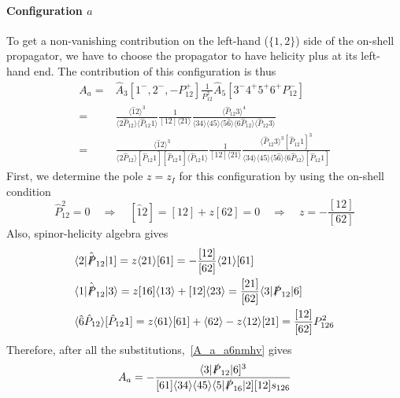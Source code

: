\paragraph{Configuration $a$}
To get a non-vanishing contribution on the left-hand ($\{1,2\}$) side of the on-shell propagator, we have to choose the propagator to have helicity plus at its left-hand end.
The contribution of this configuration is thus  
\begin{equation}\label{A_a_a6nmhv}
\begin{split}
A_a = & \hat{A}_3[1^-,2^-, -P_{12}^+]\frac{1}{P_{12}^2}\hat{A}_5[3^-4^+5^+6^+ P_{12}^-]
\\
= &\frac{\langle \hat{1}2\rangle^3}{\langle 2\hat{P}_{12}\rangle\langle \hat{P}_{12} 1\rangle}
\frac{1}{[12]\langle 21\rangle}
\frac{\langle \hat{P}_{12} 3\rangle^4}{\langle 34\rangle\langle 45\rangle\langle 5\hat{6}\rangle\langle 6\hat{P}_{12}\rangle\langle \hat{P}_{12} 3\rangle}
\\
=&
\frac{\langle \hat{1}2\rangle^3}{\langle 2\hat{P}_{12}\rangle[\hat{P}_{12} 1][\hat{P}_{12} 1]\langle \hat{P}_{12} 1\rangle}
\frac{1}{[12]\langle 21\rangle}
\frac{\langle \hat{P}_{12} 3\rangle^3[\hat{P}_{12} 1]^3}{\langle 34\rangle\langle 45\rangle\langle 5\hat{6}\rangle\langle 6\hat{P}_{12}\rangle[\hat{P}_{12} 1]}
\end{split}
\end{equation}
First, we determine the pole $z=z_I$ for this configuration by using the on-shell condition 
\begin{equation}
\hat{P}_{12}^2 = 0
\quad\Rightarrow\quad
[\hat{1}2] =  [12] + z[62] = 0
\quad\Rightarrow\quad
z= -\frac{[12]}{[62]}
\end{equation}
Also, spinor-helicity algebra gives
\begin{equation}
\begin{split}
& \langle 2 |\hat{\slashed{P}}_{12}|1] = z\langle 21\rangle[61] = -\frac{[12]}{[62]}\langle 21 \rangle[61]
\\
&
\langle 1 |\hat{\slashed{P}}_{12}|3\rangle = 
z[16]\langle 13 \rangle + [12]\langle 23 \rangle
=\frac{[21]}{[62]}\langle 3 |\slashed{P}_{12}|6]
\\
&
\langle \hat{6}\hat{P}_{12}\rangle[\hat{P}_{12}1] = z\langle 61 \rangle[61] + \langle 62\rangle - z\langle 12\rangle[21]
=
\frac{[12]}{[62]}P_{126}^2
\end{split}
\end{equation}
Therefore, after all the substitutions,~\cref{A_a_a6nmhv} gives
\begin{equation}\label{a6a}
A_a = -\frac{\langle 3 |\slashed{P}_{12}|6]^3}{[61]\langle 34\rangle \langle 45\rangle\langle 5|\slashed{P}_{16}|2][12]s_{126}}
\end{equation}
%
%
